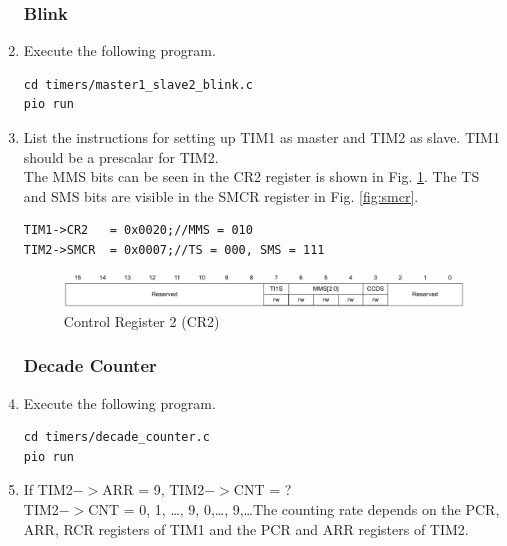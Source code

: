 \documentclass[journal,12pt,twocolumn]{IEEEtran}
\renewcommand\thesection{\arabic{section}}
\renewcommand\thesubsection{\thesection.\arabic{subsection}}
\begin{document}
\begin{enumerate}[label=\thesubsection.\arabic*.,ref=\thesubsection.\theenumi]
\subsubsection{Blink}
\item Execute the following program.
\begin{lstlisting}
cd timers/master1_slave2_blink.c
pio run
\end{lstlisting}
\item List the instructions for setting up TIM1 as master and TIM2 as slave. TIM1 should be a prescalar for TIM2.
\\
\solution The MMS bits can be seen in the CR2 register is shown in Fig. \ref{fig:cr2}. The TS and SMS bits are visible in the SMCR register
in Fig. \ref{fig:smcr}. 
\begin{lstlisting}
TIM1->CR2	= 0x0020;//MMS = 010
TIM2->SMCR	= 0x0007;//TS = 000, SMS = 111	
\end{lstlisting}
%
\begin{figure}[!h]
\begin{center}
\includegraphics[width=\columnwidth]{./stm32/timers/figs/cr2.eps}
\end{center}
\caption{Control Register 2 (CR2)}
\label{fig:cr2}
\end{figure}
%
\subsubsection{Decade Counter}
\item Execute the following program.
\begin{lstlisting}
cd timers/decade_counter.c
pio run
\end{lstlisting}
%
\item If TIM2$->$ARR = 9, TIM2$->$CNT = ?
\\
\solution TIM2$->$CNT = 0, 1, \dots, 9, 0,\dots, 9,\dots The counting rate depends on the PCR, ARR, RCR registers of TIM1 and the PCR
and ARR registers of TIM2.
\end{enumerate}
%
\end{document}
